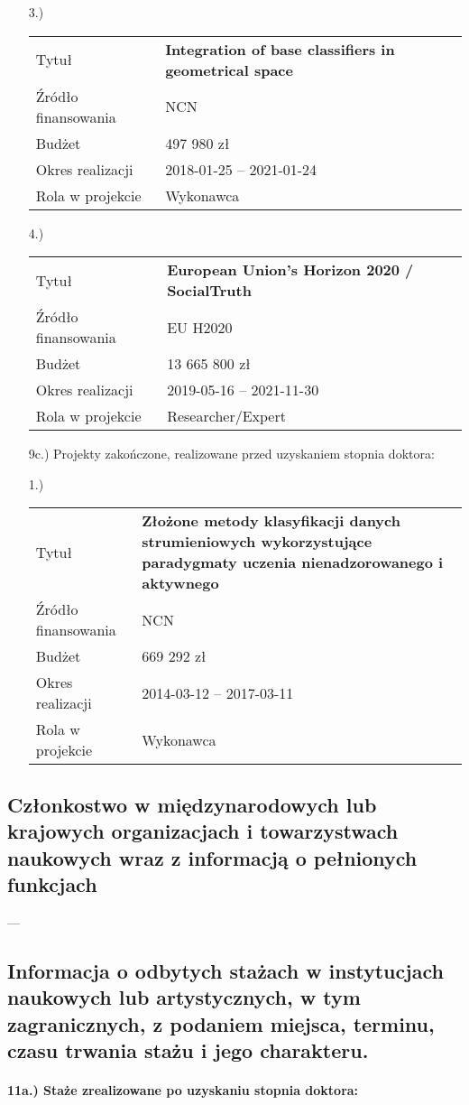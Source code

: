 \begin{fullwidth}
\begin{itemize}
\item[3.)]~\\
\begin{tabular}{p{10em}|p{20em}}
Tytuł &	\textbf{Integration of base classifiers in geometrical space}\\
Źródło finansowania & NCN\\
Budżet & 497 980 zł\\
Okres realizacji & 2018-01-25 – 2021-01-24\\
Rola w projekcie & Wykonawca
\end{tabular}

\item[4.)]~\\
\begin{tabular}{p{10em}|p{20em}}
Tytuł &	\textbf{European Union's Horizon 2020 / SocialTruth}\\
Źródło finansowania & EU H2020\\
Budżet & 13 665 800 zł\\
Okres realizacji & 2019-05-16 – 2021-11-30\\
Rola w projekcie & Researcher/Expert
\end{tabular}
\newpage
		\item[9c.)] Projekty zakończone, realizowane przed uzyskaniem stopnia doktora:

\item[1.)]~\\
\begin{tabular}{p{10em}|p{20em}}
Tytuł &	\textbf{Złożone metody klasyfikacji danych strumieniowych wykorzystujące paradygmaty uczenia nienadzorowanego i aktywnego}\\
Źródło finansowania & NCN\\
Budżet & 669 292 zł\\
Okres realizacji & 2014-03-12 – 2017-03-11\\
Rola w projekcie & Wykonawca
\end{tabular}
	\end{itemize}



\subsection{Członkostwo w międzynarodowych lub krajowych organizacjach i towarzystwach naukowych wraz z informacją o pełnionych funkcjach}

---

\subsection{Informacja o odbytych stażach w instytucjach naukowych lub artystycznych, w tym zagranicznych, z podaniem miejsca, terminu, czasu trwania stażu i jego charakteru.}

\paragraph{11a.) Staże zrealizowane po uzyskaniu stopnia doktora:}

\end{fullwidth}
